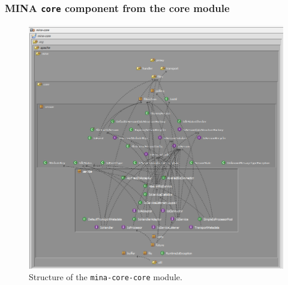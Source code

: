 \subsubsection{MINA \texttt{core} component from the core module}

\begin{figure}[H]
    \centering
    \includegraphics[scale = 0.7]{images/MINA_core_core_initial.png}
    \caption{Structure of the \texttt{mina-core-core} module.}
    \label{fig:mina_core_core_initial}
\end{figure}

